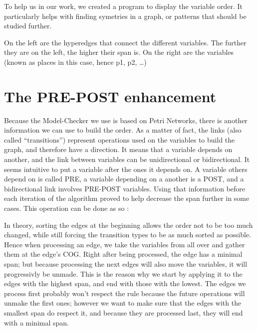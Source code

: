 \documentclass[12pt]{report}
\begin{document}
To help us in our work, we created a program to display the variable order. It particularly helps with finding symetries in a graph, or patterns that should be studied further.

On the left are the hyperedges that connect the different variables. The further they are on the left, the higher their span is. On the right are the variables (known as places in this case, hence p1, p2, \ldots)

\section{The PRE-POST enhancement}

Because the Model-Checker we use is based on Petri Networks, there is another information we can use to build the order. As a matter of fact, the links (also called \enquote{transitions}) represent operations used on the variables to build the graph, and therefore have a direction. It means that a variable depends on another, and the link between variables can be unidirectional or bidirectional. It seems intuitive to put a variable after the ones it depends on. A variable others depend on is called PRE, a variable depending on a another is a POST, and a bidirectional link involves PRE-POST variables. Using that information before each iteration of the algorithm proved to help decrease the span further in some cases.
This operation can be done as so :

\begin{algorithm}
\begin{algorithmic}[1]
  \EndFor
\EndFunction
\end{algorithmic}
\end{algorithm}

In theory, sorting the edges at the beginning allows the order not to be too much changed, while still forcing the transition types to be as much sorted as possible. Hence when processing an edge, we take the variables from all over and gather them at the edge's COG. Right after being processed, the edge has a minimal span; but because processing the next edges will also move the variables, it will progressivly be unmade. This is the reason why we start by applying it to the edges with the highest span, and end with those with the lowest. The edges we process first probably won't respect the rule because the future operations will unmake the first ones; however we want to make sure that the edges with the smallest span do respect it, and because they are processed last, they will end with a minimal span.
\end{document}
